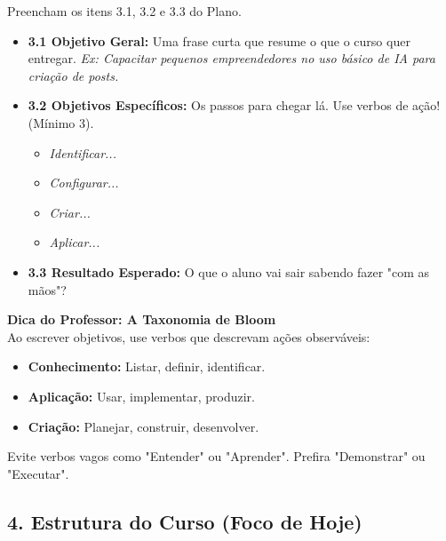 \documentclass[12pt,a4paper]{article}
\begin{document}
\begin{boxAtividade}
Preencham os itens 3.1, 3.2 e 3.3 do Plano.

\begin{itemize}
    \item \textbf{3.1 Objetivo Geral:} Uma frase curta que resume o que o curso quer entregar. 
    \textit{Ex: Capacitar pequenos empreendedores no uso básico de IA para criação de posts.}
    
    \item \textbf{3.2 Objetivos Específicos:} Os passos para chegar lá. Use verbos de ação! (Mínimo 3).
    \begin{itemize}
        \item [ ] \textit{Identificar...}
        \item [ ] \textit{Configurar...}
        \item [ ] \textit{Criar...}
        \item [ ] \textit{Aplicar...}
    \end{itemize}
    
    \item \textbf{3.3 Resultado Esperado:} O que o aluno vai sair sabendo fazer "com as mãos"?
\end{itemize}
\end{boxAtividade}

\begin{boxObservacao}
\textbf{Dica do Professor: A Taxonomia de Bloom} \\
Ao escrever objetivos, use verbos que descrevam ações observáveis:
\begin{itemize}
    \item \textbf{Conhecimento:} Listar, definir, identificar.
    \item \textbf{Aplicação:} Usar, implementar, produzir.
    \item \textbf{Criação:} Planejar, construir, desenvolver.
\end{itemize}
Evite verbos vagos como "Entender" ou "Aprender". Prefira "Demonstrar" ou "Executar".
\end{boxObservacao}

\subsection{4. Estrutura do Curso (Foco de Hoje)}
\end{document}
